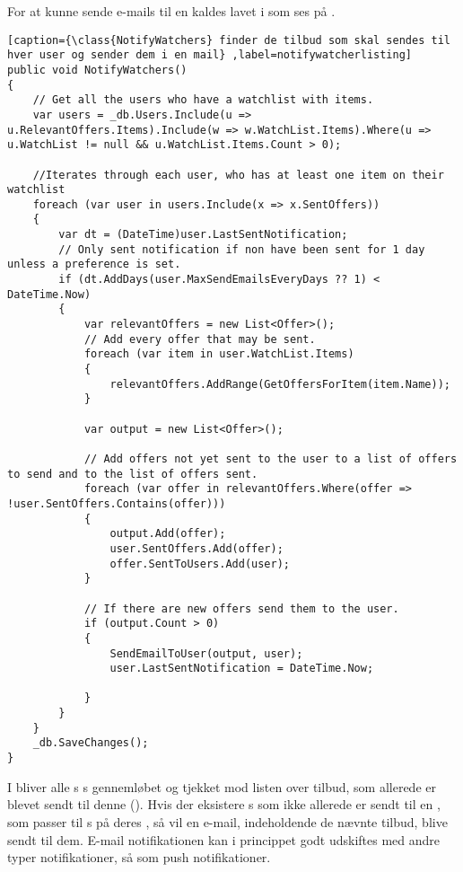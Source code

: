 For at kunne sende e-mails til en \class[User] kaldes  lavet i  som ses på . 
\begin{lstlisting}[caption={\class{NotifyWatchers} finder de tilbud som skal sendes til hver user og sender dem i en mail} ,label=notifywatcherlisting]
public void NotifyWatchers()
{
    // Get all the users who have a watchlist with items.
    var users = _db.Users.Include(u => u.RelevantOffers.Items).Include(w => w.WatchList.Items).Where(u => u.WatchList != null && u.WatchList.Items.Count > 0);

	//Iterates through each user, who has at least one item on their watchlist
    foreach (var user in users.Include(x => x.SentOffers))
    {
        var dt = (DateTime)user.LastSentNotification;
        // Only sent notification if non have been sent for 1 day unless a preference is set.
        if (dt.AddDays(user.MaxSendEmailsEveryDays ?? 1) < DateTime.Now)
        {
            var relevantOffers = new List<Offer>();
            // Add every offer that may be sent. 
            foreach (var item in user.WatchList.Items)
            {
                relevantOffers.AddRange(GetOffersForItem(item.Name));
            }

            var output = new List<Offer>();

            // Add offers not yet sent to the user to a list of offers to send and to the list of offers sent.
            foreach (var offer in relevantOffers.Where(offer => !user.SentOffers.Contains(offer)))
            {
                output.Add(offer);
                user.SentOffers.Add(offer);
                offer.SentToUsers.Add(user);
            }

            // If there are new offers send them to the user.
            if (output.Count > 0)
            {
                SendEmailToUser(output, user);
                user.LastSentNotification = DateTime.Now;

            }
        }
    }
    _db.SaveChanges();
}
\end{lstlisting}
I  bliver alle s s gennemløbet og tjekket mod listen over tilbud, som allerede er blevet sendt til denne  (). 
Hvis der eksistere s som ikke allerede er sendt til en , som passer til s på deres , så vil en e-mail, indeholdende de nævnte tilbud, blive sendt til dem. 
E-mail notifikationen kan i princippet godt udskiftes med andre typer notifikationer, så som push notifikationer. 
